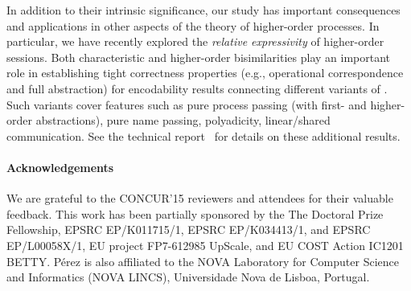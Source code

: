 In addition to their intrinsic significance, our study 
has important consequences and applications in other aspects of the theory of higher-order   processes. 
In particular,  we have recently explored the \emph{relative expressivity}
of higher-order sessions.  
 Both characteristic and higher-order bisimilarities play an important role in establishing 
 tight correctness properties (e.g., operational correspondence and full abstraction) for encodability results connecting different variants of \HOp.
 Such variants cover
 features such as 
 pure process passing (with first- and higher-order abstractions), pure name passing, polyadicity, linear/shared communication. 
 See the  
technical report~\cite{KouzapasPY15} for details on these additional results.

\paragraph{Acknowledgements} 
We are grateful to the CONCUR'15 reviewers and attendees for their valuable feedback.
This work has been partially sponsored by the The Doctoral Prize Fellowship, EPSRC EP/K011715/1, EPSRC EP/K034413/1, and EPSRC EP/L00058X/1, EU project FP7-612985 UpScale, and EU COST Action IC1201 BETTY. P\'{e}rez is also affiliated to the NOVA Laboratory for Computer Science and Informatics (NOVA LINCS), Universidade Nova de Lisboa, Portugal.
